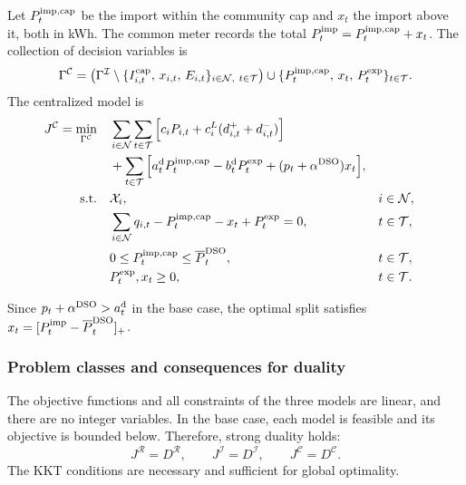 Let $P_t^{\rm imp,cap}$ be the import within the community cap and
$x_t$ the import above it, both in kWh. The common meter records the total
$P_t^{\rm imp}=P_t^{\rm imp,cap}+x_t$.
The collection of decision variables is
\[
\Gamma^{\mathcal C}
=
\left(
\Gamma^{\mathcal I}
\setminus
\{I_{i,t}^{\rm cap},\,x_{i,t},\,E_{i,t}\}_{i\in\mathcal N,\ t\in\mathcal T}
\right)
\cup
\{P_t^{\rm imp,cap},\,x_t,\,P_t^{\rm exp}\}_{t\in\mathcal T}.
\]
The centralized model is
\begin{subequations}
\label{eq:q1-model-C}
\begin{align}
J^{\mathcal C}=\min\limits_{\Gamma^{\mathcal C}}\quad&
\sum_{i\in\mathcal N}\sum_{t\in\mathcal T}
\Big[
c_iP_{i,t}
+c_i^L(d^+_{i,t}+d^-_{i,t})
\Big]
\nonumber\\
&+\sum_{t\in\mathcal T}
\Big[
a_t^{\rm d}P_t^{\rm imp,cap}
-b_t^{\rm d}P_t^{\rm exp}
+(p_t+\alpha^{\rm DSO})x_t
\Big],
\label{eq:q1-C-objective}\\
\mathrm{s.t.}\quad&
\mathcal X_i,
&&i\in\mathcal N,\\
&\sum_{i\in\mathcal N}q_{i,t}
-P_t^{\rm imp,cap}-x_t+P_t^{\rm exp}=0,
&&t\in\mathcal T,
\label{eq:q1-community-balance}\\
&0\le P_t^{\rm imp,cap}
\le\overline P_t^{\rm DSO},
&&t\in\mathcal T,
\label{eq:q1-community-cap}\\
&P_t^{\rm exp},x_t\ge0,
&&t\in\mathcal T.
\end{align}
\end{subequations}

Since $p_t+\alpha^{\rm DSO}>a_t^{\rm d}$ in the base case,
the optimal split satisfies
$x_t=[P_t^{\rm imp}-\overline P_t^{\rm DSO}]_+$.

\subsubsection{Problem classes and consequences for duality}

The objective functions and all constraints of the three
models are linear, and there are no integer variables.
In the base case, each model is feasible and its objective
is bounded below. Therefore, strong duality holds:
\begin{equation}
J^{\mathcal R}=D^{\mathcal R},\qquad
J^{\mathcal I}=D^{\mathcal I},\qquad
J^{\mathcal C}=D^{\mathcal C}.
\end{equation}
The KKT conditions are necessary and sufficient for
global optimality.

